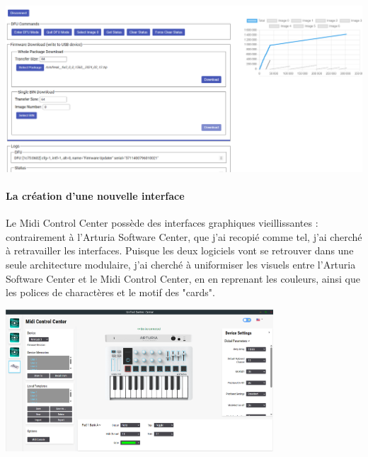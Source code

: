 \documentclass[francais]{rapportPFE}  %
\begin{document}
\begin{center}
	\centering
	\includegraphics[width=15cm]{graphics/dfu.png}
	\begin{tiny}
	\end{tiny}
	\label{fig}
\end{center}




\paragraph{La création d'une nouvelle interface}
Le Midi Control Center possède des interfaces graphiques vieillissantes : contrairement à l'Arturia Software Center, que j'ai recopié comme tel, j'ai cherché à retravailler les interfaces. Puisque les deux logiciels vont se retrouver dans une seule architecture modulaire, j'ai cherché à uniformiser les visuels entre l'Arturia Software Center et le Midi Control Center, en en reprenant les couleurs, ainsi que les polices de charactères et le motif des "cards".


\begin{center}
    \centering
    \includegraphics[width=10cm]{graphics/mcc_new.png}
    \label{fig:test1}
    \end{center}
\end{document}
